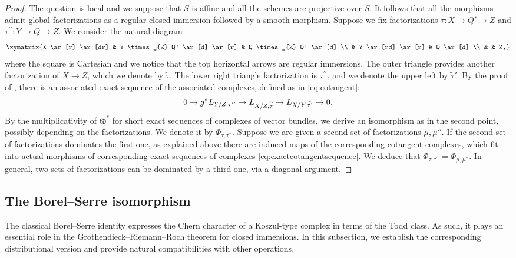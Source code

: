 \documentclass[JEP,XML,SOM,Unicode,published]{cedram}
\theoremstyle{plain}
\theoremstyle{definition}
\newcommand{\tdfrak}{\mathfrak {td}}
\begin{document}
\begin{proof}
The question is local and we suppose that $S$ is affine and all the schemes are projective over $S$. It follows that all the morphisms admit global factorizations as a regular closed immersion followed by a smooth morphism. Suppose we fix factorizations $\tau\colon X\to Q'\to Z$ and $\tau^{\prime\prime}\colon Y\to Q\to Z$. We consider the natural diagram
\begin{displaymath}
\xymatrix{X \ar[r] \ar[dr] & Y \times_{Z} Q' \ar[d] \ar[r] & Q \times_{Z} Q' \ar[d] \\
& Y \ar[rd] \ar[r] & Q \ar[d] \\
& & Z,}
\end{displaymath}
where the square is Cartesian and we notice that the top horizontal arrows are regular immersions. The outer triangle provides another factorization of $X\to Z$, which we denote by $\widetilde{\tau}$. The lower right triangle factorization is $\tau^{\prime \prime}$, and we denote the upper left by $\widetilde{\tau}'$. By the proof of \cite[Exp.\,VIII, Prop.\,2.6]{SGA6}, there is an associated exact sequence of the associated complexes, defined as in \eqref{eq:cotangent}:
\begin{equation}\label{eq:exactcotangentsequence}
0 \to g^{\ast} L_{Y/Z, \tau^{\prime \prime}} \to L_{X/Z, \widetilde{\tau}}\to L_{\substack{\vspace{-0.08cm}\\ X/Y, \widetilde{\tau}^{\prime}}}\to 0.
\end{equation}
By the multiplicativity of $\tdfrak^{\ast}$ for short exact sequences of complexes of vector bundles, we derive an isomorphism as in the second point, possibly depending on the factorizations. We denote it by $\Phi_{\tau,\tau^{\prime\prime}}$.
Suppose we are given a second set of factorizations $\mu, \mu''$. If the second set of factorizations dominates the first one, as explained above there are induced maps of the corresponding cotangent complexes, which fit into actual morphisms of corresponding exact sequences of complexes \eqref{eq:exactcotangentsequence}. We deduce that $\Phi_{\tau,\tau^{\prime\prime}}=\Phi_{\mu,\mu^{\prime \prime}}$. In general, two sets of factorizations can be dominated by a third one, via a diagonal argument.
\end{proof}

\subsection{The Borel--Serre isomorphism}\label{subsec:Borel-Serre}
\mbox{}\hspace*{-2mm}
The classical Borel--Serre identity \hbox{\cite[Lem.\,18]{Borel-Serre}} expresses the Chern character of a Koszul-type complex in terms of the Todd class. As such, it plays an essential role in the Grothendieck--Riemann--Roch theorem for closed immersions. In this subsection, we establish the corresponding distributional version and provide natural compatibilities with other operations.
\end{document}
